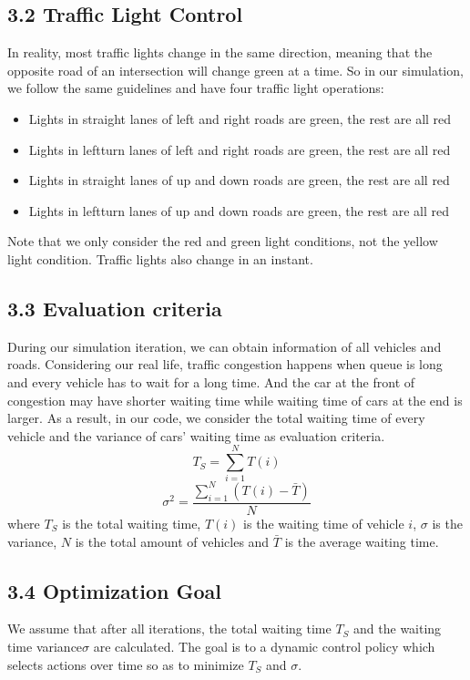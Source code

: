 \documentclass[letterpaper]{article} %
\begin{document}
\subsection{3.2 Traffic Light Control}
\hspace*{1em}In reality, most traffic lights change in the same direction, meaning that the opposite road of an intersection will change green at a time. So in our simulation, we follow the same guidelines and have four traffic light operations:
\begin{itemize}
	\item Lights in straight lanes of left and right roads are green, the rest are all red
	\item Lights in leftturn lanes of left and right roads are green, the rest are all red
	\item Lights in straight lanes of up and down roads are green, the rest are all red
	\item Lights in leftturn lanes of up and down roads are green, the rest are all red
\end{itemize}
\hspace*{1em}Note that we only consider the red and green light conditions, not the yellow light condition. Traffic lights also change in an instant.
\subsection{3.3 Evaluation criteria}
\hspace*{1em}During our simulation iteration, we can obtain information of all vehicles and roads. Considering our real life, traffic congestion happens when queue is long and every vehicle has to wait for a long time. And the car at the front of congestion may have shorter waiting time while waiting time of cars at the end is larger. As a result, in our code, we consider the total waiting time of every vehicle and the variance of cars' waiting time as evaluation criteria.
$$
T_S = \sum^N_{i=1}T(i)
$$
$$
\sigma^2 = \frac{\sum^N_{i=1}(T(i)-\bar{T})}{N}
$$
where $T_S$ is the total waiting time, $T(i)$ is the waiting time of vehicle $i$, $\sigma$ is the variance, $N$ is the total amount of vehicles and $\bar{T}$ is the average waiting time.
\subsection{3.4 Optimization Goal}
\hspace*{1em}We assume that after all iterations, the total waiting time $T_S$ and the waiting time variance$\sigma$ are calculated. The goal is to a dynamic control policy which selects actions over time so as to minimize $T_S$ and $\sigma$.
\end{document}
